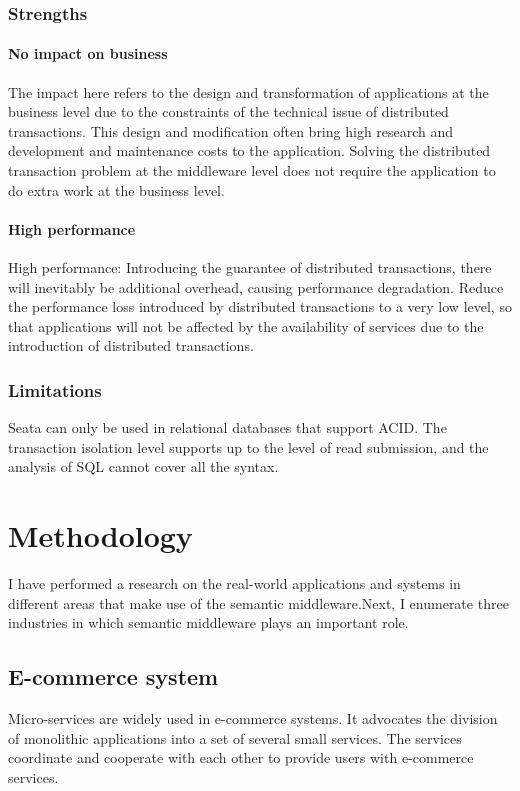 \documentclass[conference]{IEEEtran}
\begin{document}
\subsubsection{Strengths}
\paragraph{No impact on business}
The impact here refers to the design and transformation of applications at the business level due to the constraints of the technical issue of distributed transactions. This design and modification often bring high research and development and maintenance costs to the application. Solving the distributed transaction problem at the middleware level does not require the application to do extra work at the business level.

\paragraph{High performance}
High performance: Introducing the guarantee of distributed transactions, there will inevitably be additional overhead, causing performance degradation. Reduce the performance loss introduced by distributed transactions to a very low level, so that applications will not be affected by the availability of services due to the introduction of distributed transactions.

\subsubsection{Limitations}
Seata can only be used in relational databases that support ACID.
The transaction isolation level supports up to the level of read submission, and the analysis of SQL cannot cover all the syntax.

\section{Methodology}

I have performed a research on the real-world applications and systems in different areas that make use of the semantic middleware.Next, I enumerate three industries in which semantic middleware plays an important role.

\subsection{E-commerce system}

Micro-services are widely used in e-commerce systems. It advocates the division of monolithic applications into a set of several small services. The services coordinate and cooperate with each other to provide users with e-commerce services.
\end{document}
